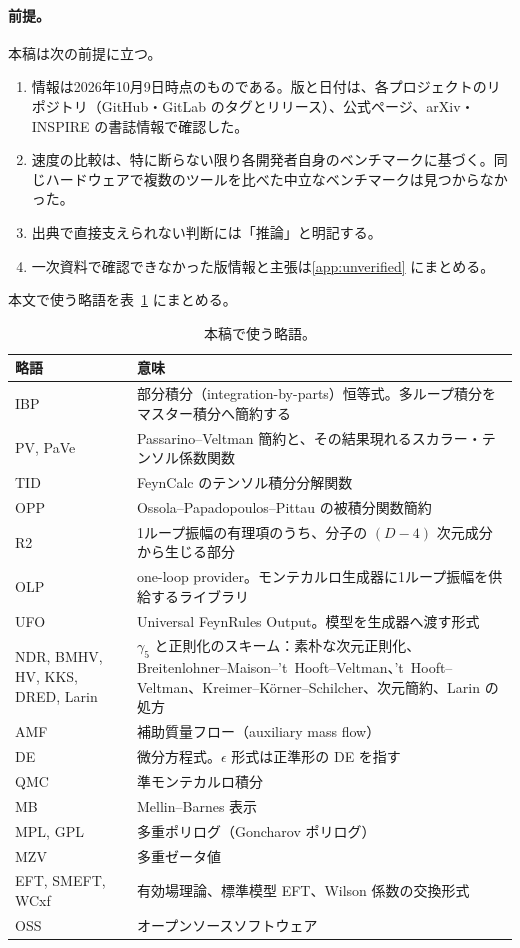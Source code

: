 \documentclass[a4paper,10pt]{ltjsarticle}
\begin{document}
\paragraph{前提。}本稿は次の前提に立つ。
\begin{enumerate}
\item 情報は2026年10月9日時点のものである。版と日付は、各プロジェクトのリポジトリ（GitHub・GitLab のタグとリリース）、公式ページ、arXiv・INSPIRE の書誌情報で確認した。
\item 速度の比較は、特に断らない限り各開発者自身のベンチマークに基づく。同じハードウェアで複数のツールを比べた中立なベンチマークは見つからなかった。
\item 出典で直接支えられない判断には「推論」と明記する。
\item 一次資料で確認できなかった版情報と主張は\ref{app:unverified} にまとめる。
\end{enumerate}
本文で使う略語を表~\ref{tab:abbr} にまとめる。

\begin{table}[tbp]
\centering\small
\caption{本稿で使う略語。}
\label{tab:abbr}
\begin{tabularx}{\linewidth}{>{\raggedright\arraybackslash}p{3.2cm}X}
\toprule
\textbf{略語} & \textbf{意味} \\
\midrule
IBP & 部分積分（integration-by-parts）恒等式。多ループ積分をマスター積分へ簡約する \\
PV, PaVe & Passarino--Veltman 簡約と、その結果現れるスカラー・テンソル係数関数 \\
TID & FeynCalc のテンソル積分分解関数 \\
OPP & Ossola--Papadopoulos--Pittau の被積分関数簡約 \\
R2 & 1ループ振幅の有理項のうち、分子の $(D-4)$ 次元成分から生じる部分 \\
OLP & one-loop provider。モンテカルロ生成器に1ループ振幅を供給するライブラリ \\
UFO & Universal FeynRules Output。模型を生成器へ渡す形式 \\
NDR, BMHV, HV, KKS, DRED, Larin & $\gamma_5$ と正則化のスキーム：素朴な次元正則化、Breitenlohner--Maison--'t~Hooft--Veltman、't~Hooft--Veltman、Kreimer--K\"orner--Schilcher、次元簡約、Larin の処方 \\
AMF & 補助質量フロー（auxiliary mass flow） \\
DE & 微分方程式。$\epsilon$ 形式は正準形の DE を指す \\
QMC & 準モンテカルロ積分 \\
MB & Mellin--Barnes 表示 \\
MPL, GPL & 多重ポリログ（Goncharov ポリログ） \\
MZV & 多重ゼータ値 \\
EFT, SMEFT, WCxf & 有効場理論、標準模型 EFT、Wilson 係数の交換形式 \\
OSS & オープンソースソフトウェア \\
\bottomrule
\end{tabularx}
\end{table}
\end{document}
